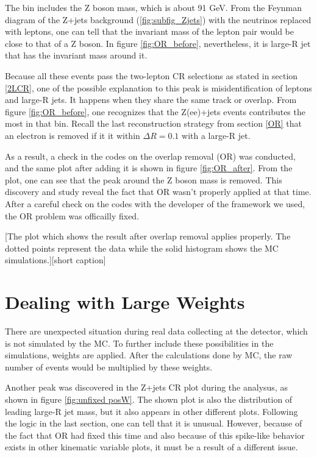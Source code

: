 \documentclass[class=NCU_thesis, crop=false]{standalone}
\begin{document}
		The bin includes the Z boson mass, which is about 91 GeV. From the Feynman diagram of the Z+jets background (\ref{fig:subfig_Zjets}) with the neutrinos replaced with leptons, one can tell that the invariant mass of the lepton pair would be close to that of a Z boson. In figure \ref{fig:OR_before}, nevertheless, it is large-R jet that has the invariant mass around it.

		Because all these events pass the two-lepton CR selections as stated in section \ref{2LCR}, one of the possible explanation to this peak is misidentification of leptons and large-R jets. It happens when they share the same track or overlap. From figure \ref{fig:OR_before}, one recognizes that the Z(ee)+jets events contributes the most in that bin. Recall the last reconstruction strategy from section \ref{OR} that an electron is removed if it it within $\Delta R = 0.1$ with a large-R jet.
		
		As a result, a check in the codes on the overlap removal (OR) was conducted, and the same plot after adding it is shown in figure \ref{fig:OR_after}. From the plot, one can see that the peak around the Z boson mass is removed. This discovery and study reveal the fact that OR wasn't properly applied at that time. After a careful check on the codes with the developer of the framework we used, the OR problem was officailly fixed.
		
		[The plot which shows the result after overlap removal applies properly. The dotted points represent the data while the solid histogram shows the MC simulations.][short caption]
	
	\section{Dealing with Large Weights}
		There are unexpected situation during real data collecting at the detector, which is not simulated by the MC. To further include these possibilities in the simulations, weights are applied. After the calculations done by MC, the raw number of events would be multiplied by these weights.
		
		Another peak was discovered in the Z+jets CR plot during the analysus, as shown in figure \ref{fig:unfixed posW}. The shown plot is also the distribution of leading large-R jet mass, but it also appears in other different plots. Following the logic in the last section, one can tell that it is unusual. However, because of the fact that OR had fixed this time and also because of this spike-like behavior exists in other kinematic variable plots, it must be a result of a different issue.
		
\end{document}
